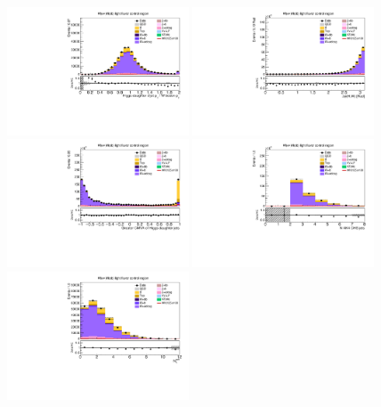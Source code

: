 \begin{figure}[tbp]
  \begin{center}
    \includegraphics[width=0.48\textwidth]{figures/wlnhbb2016/resolved/WenWHLightFlavorCR_pTBalanceDijetW.pdf}
    \includegraphics[width=0.48\textwidth]{figures/wlnhbb2016/resolved/WenWHLightFlavorCR_deltaPhiVH.pdf}
    \includegraphics[width=0.48\textwidth]{figures/wlnhbb2016/resolved/WenWHLightFlavorCR_bDiscrMax.pdf}
    \includegraphics[width=0.48\textwidth]{figures/wlnhbb2016/resolved/WenWHLightFlavorCR_nJet.pdf}
    \includegraphics[width=0.48\textwidth]{figures/wlnhbb2016/resolved/WenWHLightFlavorCR_nSoft5.pdf}

\end{center}
\end{figure}
